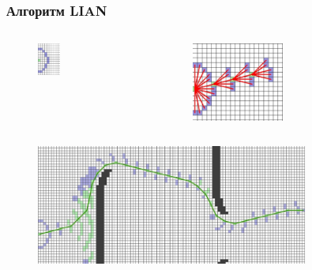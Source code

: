 \documentclass[default]{beamer}
\begin{document}
	\begin{frame}
		\frametitle{Алгоритм LIAN }
		\begin{columns}
			\begin{column}{0.5\textwidth}
				\begin{figure}
					\includegraphics[width=0.3\textwidth]{lian_1.jpg}
				\end{figure}
			\end{column}
			\begin{column}{0.5\textwidth}
				\begin{figure}
					\includegraphics[width=0.5\textwidth]{lian_2.jpg}
				\end{figure}
			\end{column}
		\end{columns}
		\begin{figure}
			\includegraphics[width=0.8\textwidth]{lian_3.jpg}
		\end{figure}
	\end{frame}
	
\end{document}
